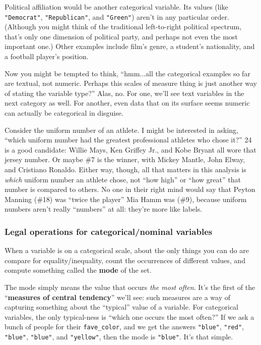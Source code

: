Political affiliation would be another categorical variable. Its values (like
\texttt{"Democrat"}, \texttt{"Republican"}, and \texttt{"Green"}) aren't in any
particular order. (Although you might think of the traditional left-to-right
political spectrum, that's only one dimension of political party, and perhaps
not even the most important one.) Other examples include film's genre, a
student's nationality, and a football player's position.

Now you might be tempted to think, ``hmm...all the categorical examples so far
are textual, not numeric. Perhaps this scales of measure thing is just another
way of stating the variable type?'' Alas, no. For one, we'll see text variables
in the next category as well. For another, even data that on its surface seems
numeric can actually be categorical in disguise.

Consider the uniform number of an athlete. I might be interested in asking,
``which uniform number had the greatest professional athletes who chose it?''
24 is a good candidate: Willie Mays, Ken Griffey Jr., and Kobe Bryant all wore
that jersey number. Or maybe \#7 is the winner, with Mickey Mantle, John Elway,
and Cristiano Ronaldo. Either way, though, all that matters in this analysis is
\textit{which} uniform number an athlete chose, not ``how high'' or ``how
great'' that number is compared to others. No one in their right mind would say
that Peyton Manning (\#18) was ``twice the player'' Mia Hamm was (\#9), because
uniform numbers aren't really ``numbers'' at all: they're more like labels.

\subsubsection{Legal operations for categorical/nominal variables}

When a variable is on a categorical scale, about the only things you can do are
compare for equality/inequality, count the occurrences of different values, and
compute something called the \textbf{mode} of the set.

The mode simply means the value that occurs \textit{the most often}. It's the
first of the ``\textbf{measures of central tendency}'' we'll see: such measures
are a way of capturing something about the ``typical'' value of a variable. For
categorical variables, the only typical-ness is ``which one occurs the most
often?'' If we ask a bunch of people for their \texttt{fave\_color}, and we get
the answers \texttt{"blue"}, \texttt{"red"}, \texttt{"blue"}, \texttt{"blue"},
and \texttt{"yellow"}, then the mode is \texttt{"blue"}. It's that simple.

